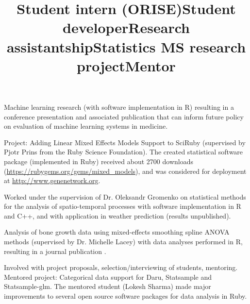 \documentclass[overlapped, line, 10pt]{res} %
\begin{document}
\begin{resume}
\title{Student intern (ORISE)}
\begin{position}
  Machine learning research (with software implementation in R) resulting in a conference presentation and associated publication \cite{gossmann2018} that can inform future policy on evaluation of machine learning systems in medicine.
\end{position}

\title{Student developer}
\begin{position}
  Project: Adding Linear Mixed Effects Models Support to SciRuby (supervised by Pjotr Prins from the Ruby Science Foundation). The created statistical software package (implemented in Ruby) received about 2700 downloads (\url{https://rubygems.org/gems/mixed_models}), and was considered for deployment at \url{http://www.genenetwork.org}.
\end{position}

\title{Research assistantship}
\begin{position}
  Worked under the supervision of Dr. Oleksandr Gromenko on statistical methods for the analysis of spatio-temporal processes with software implementation in R and C++, and with application in weather prediction (results unpublished).
\end{position}

\title{Statistics MS research project}
\begin{position}
  Analysis of bone growth data using mixed-effects smoothing spline ANOVA methods (supervised by Dr. Michelle Lacey) with data analyses performed in R, resulting in a journal publication \cite{sammarco2015}.
\end{position}

\title{Mentor}
\begin{position}
  Involved with project proposals, selection/interviewing of students, mentoring. Mentored project: Categorical data support for Daru, Statsample and Statsample-glm. The mentored student (Lokesh Sharma) made major improvements to several open source software packages for data analysis in Ruby.
\end{position}


\end{resume}
\end{document}
